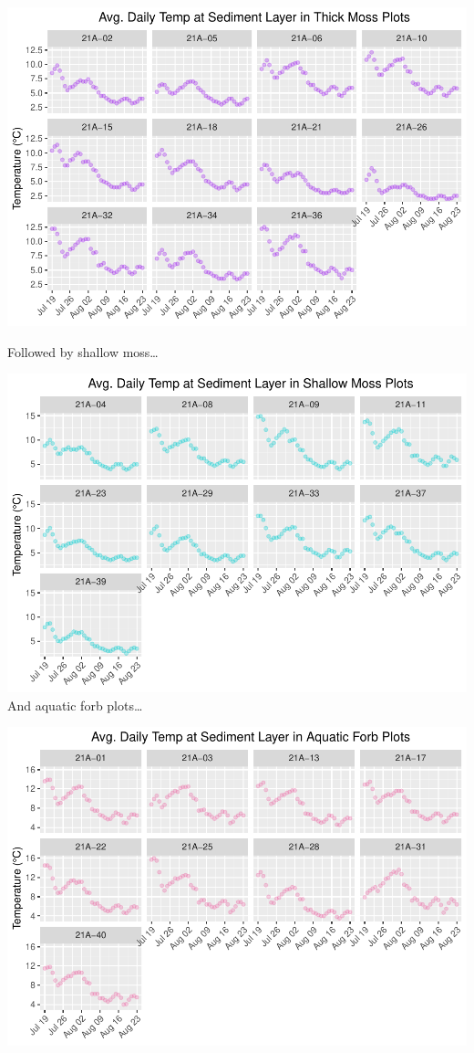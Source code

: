 \documentclass[
]{article}
\begin{document}
\includegraphics{iButtons2022-2-17_files/figure-latex/unnamed-chunk-23-1.pdf}

Followed by shallow moss\ldots{}

\includegraphics{iButtons2022-2-17_files/figure-latex/unnamed-chunk-25-1.pdf}
And aquatic forb plots\ldots{}

\includegraphics{iButtons2022-2-17_files/figure-latex/unnamed-chunk-27-1.pdf}
\end{document}
